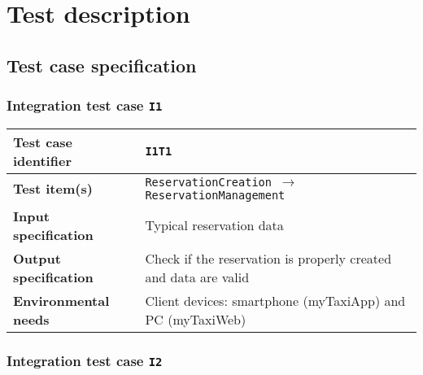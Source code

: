 \chapter{Test description}\label{chap:steps}


\section{Test case specification}

\subsection*{Integration test case \normalfont\texttt{I1}}\label{subsec:t1}

\begin{table*}[!h]\centering\begin{tabularx}{.9\textwidth}{ >{\bfseries}l X }\toprule%
Test case identifier	&	\texttt{I1T1}	\\\midrule
Test item(s)		&	\texttt{ReservationCreation $\to$ ReservationManagement}	\\\midrule
Input specification	&	Typical reservation data	\\\midrule
Output specification	&	Check if the reservation is properly created and data are valid	\\\midrule
Environmental needs	&	Client devices: smartphone (myTaxiApp) and PC (myTaxiWeb)	\\
\bottomrule\end{tabularx}\end{table*}






\subsection*{Integration test case \normalfont\texttt{I2}}\label{subsec:t2}

